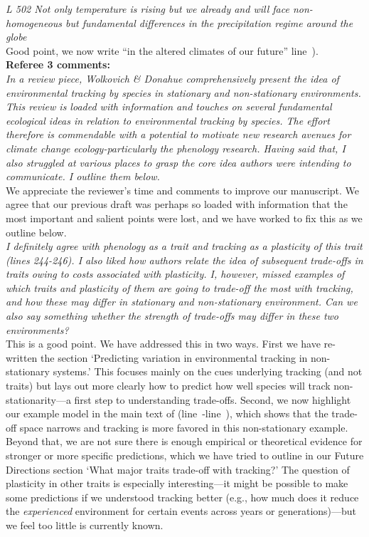 \documentclass[11pt,letterpaper]{article}
\newcommand{\lr}[1]{line~\lineref{#1}}
\begin{document}
\emph{L 502 Not only temperature is rising but we already and will face non-homogeneous but
fundamental differences in the precipitation regime around the globe}\\

Good point, we now write ``in the altered climates of our future'' \lr{r2precip2}).\\


{\bf Referee 3 comments:} \\

\emph{In a review piece, Wolkovich \& Donahue comprehensively present the idea of environmental
tracking by species in stationary and non-stationary environments. This review is loaded with
information and touches on several fundamental ecological ideas in relation to environmental
tracking by species. The effort therefore is commendable with a potential to motivate new
research avenues for climate change ecology-particularly the phenology research. Having said
that, I also struggled at various places to grasp the core idea authors were intending to
communicate. I outline them below.}\\

We appreciate the reviewer's time and comments to improve our manuscript. We agree that our previous draft was perhaps so loaded with information that the most important and salient points were lost, and we have worked to fix this as we outline below.\\

\emph{I definitely agree with phenology as a trait and tracking as a plasticity of this trait
(lines 244-246). I also liked how authors relate the idea of subsequent trade-offs in traits
owing to costs associated with plasticity. I, however, missed examples of which traits and
plasticity of them are going to trade-off the most with tracking, and how these may differ in
stationary and non-stationary environment. Can we also say something whether the strength of
trade-offs may differ in these two environments?}\\

This is a good point. We have addressed this in two ways. First we have re-written the section `Predicting variation in environmental tracking in non-stationary systems.' This focuses mainly on the cues underlying tracking (and not traits) but lays out more clearly how to predict how well species will track non-stationarity---a first step to understanding trade-offs. Second, we now highlight our example model in the main text of (\lr{r1dS1}-\lr{r1dE1}), which shows that the trade-off space narrows and tracking is more favored in this non-stationary example. Beyond that, we are not sure there is enough empirical or theoretical evidence for stronger or more specific predictions, which we have tried to outline in our Future Directions section `What major traits trade-off with tracking?' The question of plasticity in other traits is especially interesting---it might be possible to make some predictions if we understood tracking better (e.g., how much does it reduce the \emph{experienced} environment for certain events across years or generations)---but we feel too little is currently known.\\
\end{document}
